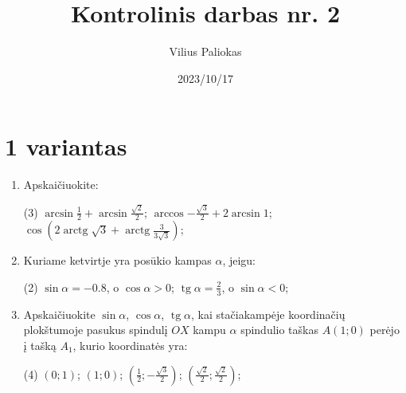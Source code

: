 \documentclass[a4paper]{article}
\title{Kontrolinis darbas nr. 2}
\author{Vilius Paliokas}
\date{2023/10/17}
\DeclareMathOperator{\tg}{tg}
\DeclareMathOperator{\arctg}{arctg}
\begin{document}
\thispagestyle{empty}
\section*{1 variantas}

\begin{enumerate}
      \item Apskaičiuokite:

            \begin{tasks}[item-format={\normalfont}, after-item-skip=4mm](3)
                  \task $\arcsin{\frac{1}{2}} + \arcsin{\frac{\sqrt{2}}{2}} $;
                  \task $\arccos{-\frac{\sqrt{3}}{2}} + 2\arcsin{1} $;
                  \task $\cos({2\arctg{\sqrt{3}} +
                              \arctg{\frac{3}{3\sqrt{3}}}})  $;

            \end{tasks}

      \item Kuriame ketvirtje yra posūkio kampas $\alpha$, jeigu:
            \begin{tasks}[item-format={\normalfont}, after-item-skip=4mm](2)
                  \task $\sin \alpha = -0.8$, o $\cos \alpha > 0$;
                  \task $\tg \alpha = \frac{2}{3}$, o $\sin \alpha < 0$;
            \end{tasks}
      \item Apskaičiuokite $\sin \alpha$, $\cos \alpha$, $\tg \alpha$, kai
            stačiakampėje koordinačių plokštumoje pasukus spindulį $OX$ kampu $\alpha$ spindulio taškas $A(1; 0)$ perėjo į tašką $A_{1}$, kurio koordinatės yra:
            \begin{tasks}[item-format={\normalfont}, after-item-skip=4mm](4)
                  \task $(0; 1)$;
                  \task $(1; 0)$;
                  \task $(\frac{1}{2}; -\frac{\sqrt{3}}{2})$;
                  \task $(\frac{\sqrt{2}}{2}; \frac{\sqrt{2}}{2})$;
            \end{tasks}



\end{enumerate}
\end{document}

